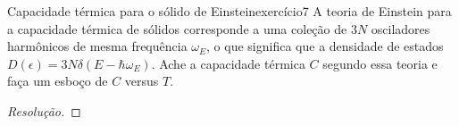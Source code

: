 \begin{exercício}{Capacidade térmica para o sólido de Einstein}{exercício7}
    A teoria de Einstein para a capacidade térmica de sólidos corresponde a uma coleção de \(3N\) osciladores harmônicos de mesma frequência \(\omega_E\), o que significa que a densidade de estados \(D(\epsilon) = 3 N \delta(E - \hbar \omega_E)\). Ache a capacidade térmica \(C\) segundo essa teoria e faça um esboço de \(C\) versus \(T\).
\end{exercício}
\begin{proof}[Resolução]

\end{proof}
